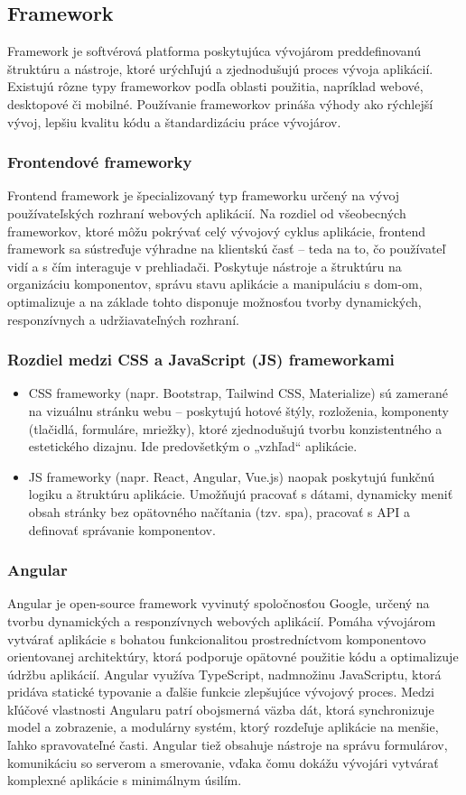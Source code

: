  \subsection{Framework}
 Framework je softvérová platforma poskytujúca vývojárom preddefinovanú štruktúru a nástroje, ktoré urýchľujú a zjednodušujú proces vývoja aplikácií.
 Existujú rôzne typy frameworkov podľa oblasti použitia, napríklad webové, desktopové či mobilné.
 Používanie frameworkov prináša výhody ako rýchlejší vývoj, lepšiu kvalitu kódu a štandardizáciu práce vývojárov. \cite{framework}
 \subsubsection*{Frontendové frameworky}
 Frontend framework je špecializovaný typ frameworku určený na vývoj používateľských rozhraní webových aplikácií.
 Na rozdiel od všeobecných frameworkov, ktoré môžu pokrývať celý vývojový cyklus aplikácie, frontend framework sa sústreďuje výhradne na klientskú časť – teda na to, čo používateľ vidí a s čím interaguje v prehliadači.
 Poskytuje nástroje a štruktúru na organizáciu komponentov, správu stavu aplikácie a manipuláciu s \acrshort{dom}-om, optimalizuje a na základe tohto disponuje možnosťou tvorby dynamických, responzívnych a udržiavateľných rozhraní.
 \subsubsection*{Rozdiel medzi CSS a JavaScript (JS) frameworkami}
 \begin{itemize}
  \item CSS frameworky (napr. Bootstrap, Tailwind CSS, Materialize) sú zamerané na vizuálnu stránku webu – poskytujú hotové štýly, rozloženia, komponenty (tlačidlá, formuláre, mriežky), ktoré zjednodušujú tvorbu konzistentného a estetického dizajnu. Ide predovšetkým o „vzhľad“ aplikácie.
  \item JS frameworky (napr. React, Angular, Vue.js) naopak poskytujú funkčnú logiku a štruktúru aplikácie. 
  Umožňujú pracovať s dátami, dynamicky meniť obsah stránky bez opätovného načítania (tzv. \acrshort{spa}), pracovať s API a definovať správanie komponentov.\cite{feframework}
\end{itemize}
\subsubsection*{Angular}
Angular je open-source framework vyvinutý spoločnosťou Google, určený na tvorbu dynamických a responzívnych webových aplikácií.
Pomáha vývojárom vytvárať aplikácie s bohatou funkcionalitou prostredníctvom komponentovo orientovanej architektúry, ktorá podporuje opätovné použitie kódu a optimalizuje údržbu aplikácií.
Angular využíva TypeScript, nadmnožinu JavaScriptu, ktorá pridáva statické typovanie a ďalšie funkcie zlepšujúce vývojový proces. 
Medzi kľúčové vlastnosti Angularu patrí obojsmerná väzba dát, ktorá synchronizuje model a zobrazenie, a modulárny systém, ktorý rozdeľuje aplikácie na menšie, ľahko spravovateľné časti.
Angular tiež obsahuje nástroje na správu formulárov, komunikáciu so serverom a smerovanie, vďaka čomu dokážu vývojári vytvárať komplexné aplikácie s minimálnym úsilím. \cite{angular}

